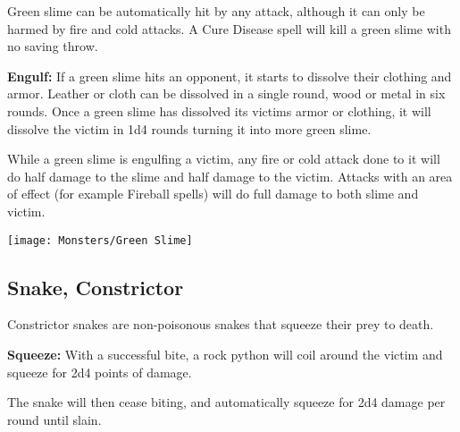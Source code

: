 \begin{multicols*}{2}
Green slime can be automatically hit by any attack, although it can only be harmed by fire and cold attacks. A Cure Disease spell will kill a green slime with no saving throw.

\textbf{Engulf:} If a green slime hits an opponent, it starts to dissolve their clothing and armor. Leather or cloth can be dissolved in a single round, wood or metal in six rounds. Once a green slime has dissolved its victims armor or clothing, it will dissolve the victim in 1d4 rounds turning it into more green slime.

While a green slime is engulfing a victim, any fire or cold attack done to it will do half damage to the slime and half damage to the victim. Attacks with an area of effect (for example Fireball spells) will do full damage to both slime and victim.

\texttt{[image: Monsters/Green Slime]}

\subsection{Snake, Constrictor}

Constrictor snakes are non-poisonous snakes that squeeze their prey to death.

\textbf{Squeeze:} With a successful bite, a rock python will coil around the victim and squeeze for 2d4 points of damage.

The snake will then cease biting, and automatically squeeze for 2d4 damage per round until slain.


\end{multicols*}
